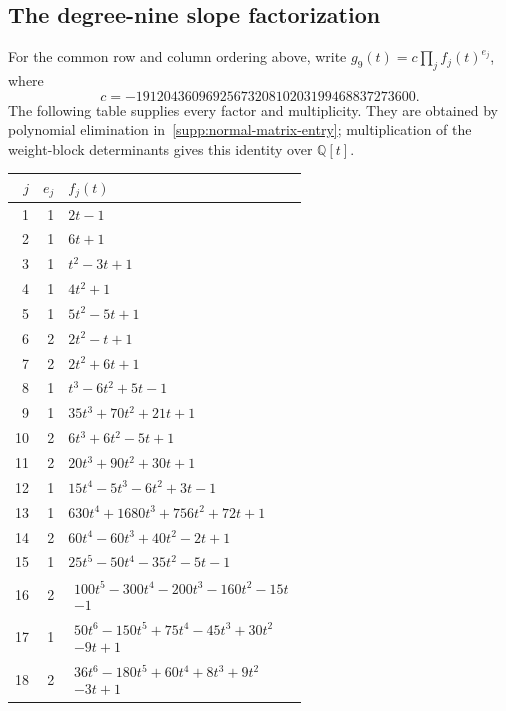 \documentclass[11pt]{amsart}
\theoremstyle{definition}
\theoremstyle{remark}
\numberwithin{equation}{section}
\begin{document}
{\subsection{The degree-nine slope factorization}\label{low:g9-factors}
For the common row and column ordering above, write $g_9(t)=c\prod_j f_j(t)^{e_j}$, where
\[
c=-1912043609692567320810203199468837273600.
\]
The following table supplies every factor and multiplicity. They are obtained by polynomial elimination in~\eqref{supp:normal-matrix-entry}; multiplication of the weight-block determinants gives this identity over $\mathbb Q[t]$.
{\small
\begin{longtable}{r r p{}}
\toprule $j$ & $e_j$ & $f_j(t)$ \\\midrule\endhead
1&1& $2 t - 1$ \\
2&1& $6 t + 1$ \\
3&1& $t^{2} - 3 t + 1$ \\
4&1& $4 t^{2} + 1$ \\
5&1& $5 t^{2} - 5 t + 1$ \\
6&2& $2 t^{2} - t + 1$ \\
7&2& $2 t^{2} + 6 t + 1$ \\
8&1& $t^{3} - 6 t^{2} + 5 t - 1$ \\
9&1& $35 t^{3} + 70 t^{2} + 21 t + 1$ \\
10&2& $6 t^{3} + 6 t^{2} - 5 t + 1$ \\
11&2& $20 t^{3} + 90 t^{2} + 30 t + 1$ \\
12&1& $15 t^{4} - 5 t^{3} - 6 t^{2} + 3 t - 1$ \\
13&1& $630 t^{4} + 1680 t^{3} + 756 t^{2} + 72 t + 1$ \\
14&2& $60 t^{4} - 60 t^{3} + 40 t^{2} - 2 t + 1$ \\
15&1& $25 t^{5} - 50 t^{4} - 35 t^{2} - 5 t - 1$ \\
16&2& $\begin{gathered}100 t^{5} - 300 t^{4} - 200 t^{3} - 160 t^{2} - 15 t\\-1\end{gathered}$ \\
17&1& $\begin{gathered}50 t^{6} - 150 t^{5} + 75 t^{4} - 45 t^{3} + 30 t^{2}\\- 9 t + 1\end{gathered}$ \\
18&2& $\begin{gathered}36 t^{6} - 180 t^{5} + 60 t^{4} + 8 t^{3} + 9 t^{2}\\- 3 t + 1\end{gathered}$ \\

\end{longtable}}}
\end{document}
